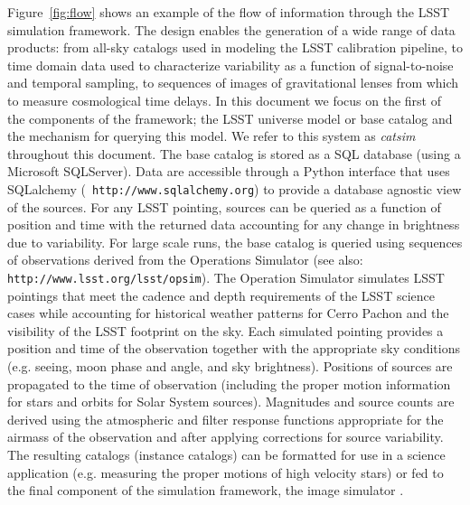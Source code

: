 \documentclass[]{article}
\begin{document}
Figure~\ref{fig:flow} shows an example of the flow of information
through the LSST simulation framework. 
The design enables the generation of a wide range of data products:
from all-sky catalogs used in modeling the LSST calibration pipeline,
to time domain data used to characterize variability as a function of
signal-to-noise and temporal sampling, to sequences of images of
gravitational lenses from which to measure cosmological time delays.
In this document we focus on the first of the components of the
framework; the LSST universe model or base catalog and the mechanism
for querying this model. We refer to this system as {\it catsim}
throughout this document.  The base catalog is stored as a SQL
database (using a Microsoft SQLServer). Data are accessible through a
Python interface that uses SQLalchemy ({\tt
  http://www.sqlalchemy.org}) to provide a database agnostic view of
the sources. For any LSST pointing, sources can be queried as a
function of position and time with the returned data accounting for
any change in brightness due to variability. For large scale runs, the
base catalog is queried using sequences of observations derived from
the Operations Simulator \citep{cook09} (see also: {\tt
  http://www.lsst.org/lsst/opsim}).  The Operation Simulator simulates
LSST pointings that meet the cadence and depth requirements of the
LSST science cases while accounting for historical weather patterns
for Cerro Pachon and the visibility of the LSST footprint on the
sky. Each simulated pointing provides a position and time of the
observation together with the appropriate sky conditions (e.g. seeing,
moon phase and angle, and sky brightness). Positions of sources are
propagated to the time of observation (including the proper motion
information for stars and orbits for Solar System sources). Magnitudes
and source counts are derived using the atmospheric and filter
response functions appropriate for the airmass of the observation and
after applying corrections for source variability. The resulting
catalogs (instance catalogs) can be formatted for use in a science
application (e.g. measuring the proper motions of high velocity stars)
or fed to the final component of the simulation framework, the image
simulator \citep{phosim}.
\end{document}
